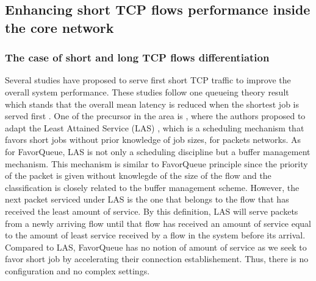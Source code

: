 \documentclass{elsart}
\begin{document}
\subsection{Enhancing short TCP flows performance inside the core network}

\subsubsection{The case of short and long TCP flows differentiation}

Several studies \cite{Kantawala02}\cite{avrachenkov04}\cite{rai05} have proposed to serve first short TCP traffic to improve the overall system performance. These studies follow one queueing theory result which stands that the overall mean latency is reduced when the shortest job is served first \cite{Kleinrock75}. 
One of the precursor in the area is \cite{rai05}, where the authors proposed to adapt the Least Attained Service (LAS) \cite{Kleinrock75}, which is a scheduling mechanism that favors short jobs without prior knowledge of job sizes, for packets networks. 
As for FavorQueue, LAS is not only a scheduling discipline but a buffer management mechanism. This mechanism is similar to FavorQueue principle since the priority of the packet is given without knowlegde of the size of the flow and the classification is closely related to the buffer management scheme.  However, the next packet serviced under LAS is the one that belongs to the flow that has received the least amount of service. By this definition, LAS will serve packets from a newly arriving flow until that flow has received an amount of service equal to the amount of least service received by a flow in the system before its arrival. Compared to LAS, FavorQueue has no notion of amount of service as we seek to favor short job by accelerating their connection establishement. Thus, there is no configuration and no complex settings.
\end{document}
